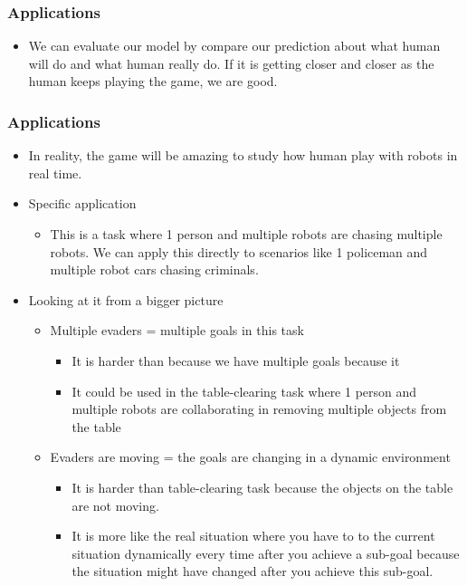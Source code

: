 

\subsubsection{Applications}
\begin{itemize}
    \item We can evaluate our model by compare our prediction about what human will do and what human really do. If it is getting closer and closer as the human keeps playing the game, we are good.
\end{itemize}

\subsubsection{Applications}
\begin{itemize}
    \item In reality, the game will be amazing to study how human play with robots in real time.
    \item Specific application
    \begin{itemize}
        \item This is a task where 1 person and multiple robots are chasing multiple robots. We can apply this directly to scenarios like 1 policeman and multiple robot cars chasing criminals.
    \end{itemize}
    \item Looking at it from a bigger picture
    \begin{itemize}
        \item Multiple evaders = multiple goals in this task
        \begin{itemize}
            \item It is harder than \cite{Nikolaidis_2016_8035} because we have multiple goals because it 
            \item It could be used in the table-clearing task where 1 person and multiple robots are collaborating in removing multiple objects from the table
        \end{itemize}

        \item Evaders are moving = the goals are changing in a dynamic environment
        \begin{itemize}
            \item It is harder than table-clearing task because the objects on the table are not moving.
            \item It is more like the real situation where you have to  to the current situation dynamically every time after you achieve a sub-goal because the situation might have changed after you achieve this sub-goal.
        \end{itemize}


\end{itemize}
\end{itemize}
